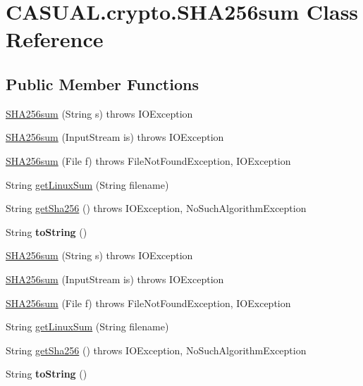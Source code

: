 \hypertarget{class_c_a_s_u_a_l_1_1crypto_1_1_s_h_a256sum}{\section{C\-A\-S\-U\-A\-L.\-crypto.\-S\-H\-A256sum Class Reference}
\label{class_c_a_s_u_a_l_1_1crypto_1_1_s_h_a256sum}
}
\subsection*{Public Member Functions}
\begin{DoxyCompactItemize}
\item 
\hyperlink{class_c_a_s_u_a_l_1_1crypto_1_1_s_h_a256sum_afc1d07faf79184606a8af15153c430e2}{S\-H\-A256sum} (String s)  throws I\-O\-Exception 
\item 
\hyperlink{class_c_a_s_u_a_l_1_1crypto_1_1_s_h_a256sum_ac400cc047e8571a90385f233a4ac15b6}{S\-H\-A256sum} (Input\-Stream is)  throws I\-O\-Exception 
\item 
\hyperlink{class_c_a_s_u_a_l_1_1crypto_1_1_s_h_a256sum_ad4848f903e6697b02b6232305eb0c958}{S\-H\-A256sum} (File f)  throws File\-Not\-Found\-Exception, I\-O\-Exception 
\item 
String \hyperlink{class_c_a_s_u_a_l_1_1crypto_1_1_s_h_a256sum_aac8a59bd709fff8830cbde5f522c4154}{get\-Linux\-Sum} (String filename)
\item 
String \hyperlink{class_c_a_s_u_a_l_1_1crypto_1_1_s_h_a256sum_a8deae101346f9a0a66ca8c3b0d2db1df}{get\-Sha256} ()  throws I\-O\-Exception, No\-Such\-Algorithm\-Exception 
\item 
\hypertarget{class_c_a_s_u_a_l_1_1crypto_1_1_s_h_a256sum_a9defac2b59b78def91fa66965f9bb299}{String {\bfseries to\-String} ()}\label{class_c_a_s_u_a_l_1_1crypto_1_1_s_h_a256sum_a9defac2b59b78def91fa66965f9bb299}

\item 
\hyperlink{class_c_a_s_u_a_l_1_1crypto_1_1_s_h_a256sum_afc1d07faf79184606a8af15153c430e2}{S\-H\-A256sum} (String s)  throws I\-O\-Exception 
\item 
\hyperlink{class_c_a_s_u_a_l_1_1crypto_1_1_s_h_a256sum_ac400cc047e8571a90385f233a4ac15b6}{S\-H\-A256sum} (Input\-Stream is)  throws I\-O\-Exception 
\item 
\hyperlink{class_c_a_s_u_a_l_1_1crypto_1_1_s_h_a256sum_ad4848f903e6697b02b6232305eb0c958}{S\-H\-A256sum} (File f)  throws File\-Not\-Found\-Exception, I\-O\-Exception 
\item 
String \hyperlink{class_c_a_s_u_a_l_1_1crypto_1_1_s_h_a256sum_aac8a59bd709fff8830cbde5f522c4154}{get\-Linux\-Sum} (String filename)
\item 
String \hyperlink{class_c_a_s_u_a_l_1_1crypto_1_1_s_h_a256sum_a8deae101346f9a0a66ca8c3b0d2db1df}{get\-Sha256} ()  throws I\-O\-Exception, No\-Such\-Algorithm\-Exception 
\item 
\hypertarget{class_c_a_s_u_a_l_1_1crypto_1_1_s_h_a256sum_a9defac2b59b78def91fa66965f9bb299}{String {\bfseries to\-String} ()}\label{class_c_a_s_u_a_l_1_1crypto_1_1_s_h_a256sum_a9defac2b59b78def91fa66965f9bb299}

\end{DoxyCompactItemize}

